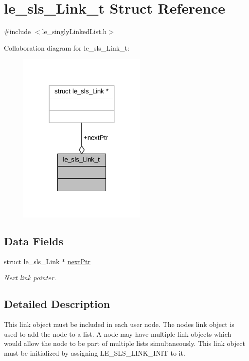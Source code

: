 \hypertarget{structle__sls___link__t}{}\section{le\+\_\+sls\+\_\+\+Link\+\_\+t Struct Reference}
\label{structle__sls___link__t}


{\ttfamily \#include $<$le\+\_\+singly\+Linked\+List.\+h$>$}



Collaboration diagram for le\+\_\+sls\+\_\+\+Link\+\_\+t\+:
\nopagebreak
\begin{figure}[H]
\begin{center}
\leavevmode
\includegraphics[width=180pt]{structle__sls___link__t__coll__graph}
\end{center}
\end{figure}
\subsection*{Data Fields}
\begin{DoxyCompactItemize}
\item 
struct le\+\_\+sls\+\_\+\+Link $\ast$ \hyperlink{structle__sls___link__t_ab3b10ba398661c42032ece7720860ee2}{next\+Ptr}
\begin{DoxyCompactList}\small\item\em Next link pointer. \end{DoxyCompactList}\end{DoxyCompactItemize}


\subsection{Detailed Description}
This link object must be included in each user node. The node\textquotesingle{}s link object is used to add the node to a list. A node may have multiple link objects which would allow the node to be part of multiple lists simultaneously. This link object must be initialized by assigning L\+E\+\_\+\+S\+L\+S\+\_\+\+L\+I\+N\+K\+\_\+\+I\+N\+IT to it.

